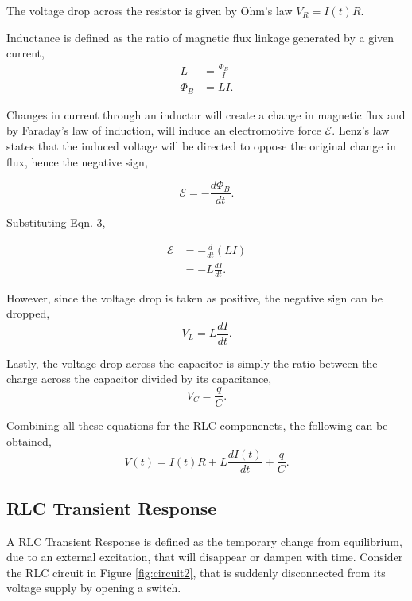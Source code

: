 \documentclass{article}
\begin{document}
The voltage drop across the resistor is given by Ohm's law $V_{R}=I(t)R$.

Inductance is defined as the ratio of magnetic flux linkage generated by a 
given current,
\begin{equation}
    \begin{split}
    L &= \frac{\Phi_B}{I} \\
    \Phi_B &= LI.
    \end{split}
\end{equation}

Changes in current through an inductor will create a change in magnetic 
flux and by Faraday's law of induction, will induce an electromotive force
$\mathcal{E}$. Lenz's law states that the induced voltage will be directed
to oppose the original change in flux, hence the negative sign,

\begin{equation}
    \mathcal{E} = -\frac{d\Phi_B}{dt}.
\end{equation}

Substituting Eqn. 3,

\begin{equation}
    \begin{split}
        \mathcal{E} &= -\frac{d}{dt}(LI) \\
        &= -L\frac{dI}{dt}.
    \end{split}
\end{equation}

However, since the voltage drop is taken as positive, the negative sign can
be dropped,
\begin{equation}
    V_L = L\frac{dI}{dt}.
\end{equation}

Lastly, the voltage drop across the capacitor is simply the ratio between the 
charge across the capacitor divided by its capacitance,
\begin{equation}
    V_C = \frac{q}{C}.
\end{equation}

Combining all these equations for the RLC componenets, the following can be 
obtained,
\begin{equation}
    V(t) = I(t)R + L\frac{dI(t)}{dt} + \frac{q}{C}.
\end{equation}
\subsection{RLC Transient Response}
A RLC Transient Response is defined as the temporary change from equilibrium,
due to an external excitation, that will disappear or dampen with time. 
Consider the RLC circuit in Figure \ref{fig:circuit2}, that is suddenly 
disconnected from its voltage supply by opening a switch.
\end{document}
